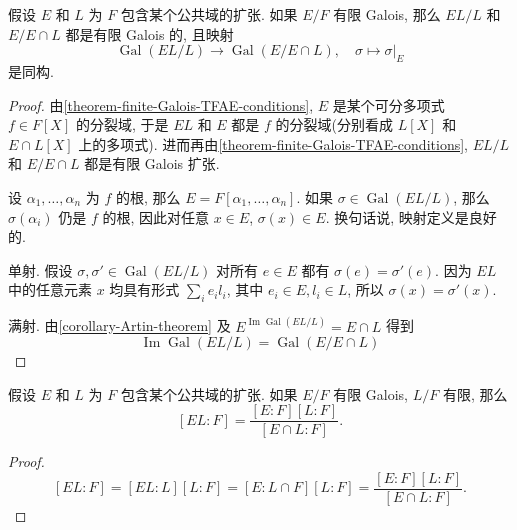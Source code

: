 \begin{proposition}
  \label{proposition-composite-field-Galois-over-middle-field}
  假设 \( E \) 和 \( L \) 为 \( F \) 包含某个公共域的扩张.
  如果 \( E / F \) 有限 Galois, 那么 \( EL / L \) 和 \( E / E \cap L \)
  都是有限 Galois 的, 且映射
  \[
    \operatorname{Gal}(EL / L) \to \operatorname{Gal}(E / E \cap L),\quad \sigma
    \mapsto \left. \sigma \right\vert_E
  \]
  是同构.
\end{proposition}
\begin{proof}
  由\cref{theorem-finite-Galois-TFAE-conditions}, \( E \) 是某个可分多项式 \( f
  \in F[X] \) 的分裂域, 于是 \( EL \) 和 \( E \) 都是 \( f \) 的分裂域(分别看成
  \( L[X] \) 和 \( E \cap L[X] \) 上的多项式).
  进而再由\cref{theorem-finite-Galois-TFAE-conditions}, \( EL/L \) 和 \( E/E
  \cap L \) 都是有限 Galois 扩张.

  设 \( \alpha_1, \ldots, \alpha_n \) 为 \( f \) 的根, 那么 \( E = F[\alpha_1,
  \ldots, \alpha_n] \).
  如果 \( \sigma \in \operatorname{Gal}(EL/L) \), 那么 \( \sigma(\alpha_i) \)
  仍是 \( f \) 的根, 因此对任意 \( x \in E \), \( \sigma(x) \in E \).
  换句话说, 映射定义是良好的.

  单射.
  假设  \( \sigma, \sigma' \in \operatorname{Gal}(EL/L) \) 对所有 \( e \in E \)
  都有 \( \sigma(e) = \sigma'(e) \).
  因为 \( EL \) 中的任意元素 \( x \) 均具有形式 \( \sum_i e_i l_i \), 其中 \(
  e_i \in E, l_i \in L \), 所以 \( \sigma(x) = \sigma'(x) \).

  满射.
  由\cref{corollary-Artin-theorem} 及 \( E^{\operatorname{Im}
  \operatorname{Gal}(EL/L)} = E \cap L \) 得到
  \[
    \operatorname{Im} \operatorname{Gal}(EL/L) = \operatorname{Gal}(E/E \cap L)
  \]
\end{proof}

\begin{corollary}
  \label{corollary-composite-field-Galois-over-middle-field}
  假设 \( E \) 和 \( L \) 为 \( F \) 包含某个公共域的扩张.
  如果 \( E / F \) 有限 Galois, \( L / F \) 有限, 那么
  \[
    [EL : F] = \frac{[E:F][L:F]}{[E \cap L : F]}.
  \]
\end{corollary}
\begin{proof}
  \[
    [EL : F] = [EL:L][L:F] = [E:L \cap F][L:F] = \frac{[E:F][L:F]}{[E \cap L :
    F]}.
  \]
\end{proof}

